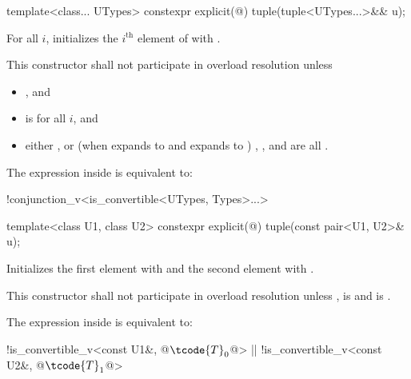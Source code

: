 %
\begin{itemdecl}
template<class... UTypes> constexpr explicit(@\seebelow@) tuple(tuple<UTypes...>&& u);
\end{itemdecl}

\begin{itemdescr}
\pnum
\effects
For all $i$,
initializes the $i^\text{th}$ element of  with
.

\pnum
\remarks
This constructor shall not participate in overload resolution unless
\begin{itemize}
\item
{} \tcode{==} , and
\item
{} is  for all $i$, and
\item
either
, or
(when  expands to  and  expands to )
, ,
and  are all .
\end{itemize}
The expression inside  is equivalent to:
\begin{codeblock}
!conjunction_v<is_convertible<UTypes, Types>...>
\end{codeblock}
\end{itemdescr}

%
%
\begin{itemdecl}
template<class U1, class U2> constexpr explicit(@\seebelow@) tuple(const pair<U1, U2>& u);
\end{itemdecl}

\begin{itemdescr}
\pnum
\effects
Initializes the first element with  and the
second element with .

\pnum
\remarks
This constructor shall not participate in overload resolution unless
,
 is  and
 is .

\pnum
The expression inside  is equivalent to:
\begin{codeblock}
!is_convertible_v<const U1&, @$\tcode{T}_0$@> || !is_convertible_v<const U2&, @$\tcode{T}_1$@>
\end{codeblock}
\end{itemdescr}

